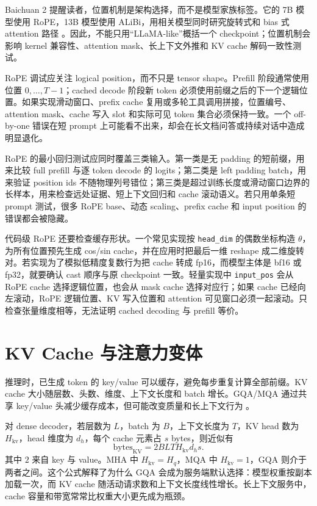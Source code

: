 \documentclass[UTF8,zihao=-4,openany]{ctexbook}
\begin{document}
Baichuan 2 提醒读者，位置机制是架构选择，而不是模型家族标签。它的 7B 模型使用 RoPE，13B 模型使用 ALiBi，用相关模型同时研究旋转式和 bias 式 attention 路径 \cite{yang2023baichuan2}。因此，不能只用“LLaMA-like”概括一个 checkpoint；位置机制会影响 kernel 兼容性、attention mask、长上下文外推和 KV cache 解码一致性测试。

RoPE 调试应关注 logical position，而不只是 tensor shape。Prefill 阶段通常使用位置 $0,\ldots,T-1$；cached decode 阶段新 token 必须使用前缀之后的下一个逻辑位置。如果实现滑动窗口、prefix cache 复用或多轮工具调用拼接，位置编号、attention mask、cache 写入 slot 和实际可见 token 集合必须保持一致。一个 off-by-one 错误在短 prompt 上可能看不出来，却会在长文档问答或持续对话中造成明显退化。

RoPE 的最小回归测试应同时覆盖三类输入。第一类是无 padding 的短前缀，用来比较 full prefill 与逐 token decode 的 logits；第二类是 left padding batch，用来验证 position ids 不随物理列号错位；第三类是超过训练长度或滑动窗口边界的长样本，用来检查远处证据、短上下文回归和 cache 滚动语义。若只用单条短 prompt 测试，很多 RoPE base、动态 scaling、prefix cache 和 input position 的错误都会被隐藏。

代码级 RoPE 还要检查缓存形状。一个常见实现按 \texttt{head\_dim} 的偶数坐标构造 $\theta$，为所有位置预先生成 cos/sin cache，并在应用时把最后一维 reshape 成二维旋转对。若实现为了模拟低精度复数行为把 cache 转成 fp16，而模型主体是 bf16 或 fp32，就要确认 cast 顺序与原 checkpoint 一致。轻量实现中 \texttt{input\_pos} 会从 RoPE cache 选择逻辑位置，也会从 mask cache 选择对应行；如果 cache 已经向左滚动，RoPE 逻辑位置、KV 写入位置和 attention 可见窗口必须一起滚动。只检查张量维度相等，无法证明 cached decoding 与 prefill 等价。

\section{KV Cache 与注意力变体}
推理时，已生成 token 的 key/value 可以缓存，避免每步重复计算全部前缀。KV cache 大小随层数、头数、维度、上下文长度和 batch 增长。GQA/MQA 通过共享 key/value 头减少缓存成本，但可能改变质量和长上下文行为 \cite{ainslie2023gqa}。

对 dense decoder，若层数为 $L$，batch 为 $B$，上下文长度为 $T$，KV head 数为 $H_{\mathrm{kv}}$，head 维度为 $d_h$，每个 cache 元素占 $s$ bytes，则近似有
\[
  \mathrm{bytes}_{\mathrm{KV}}
  = 2BLT H_{\mathrm{kv}}d_hs .
\]
其中 $2$ 来自 key 与 value。MHA 中 $H_{\mathrm{kv}}=H_q$，MQA 中 $H_{\mathrm{kv}}=1$，GQA 则介于两者之间。这个公式解释了为什么 GQA 会成为服务端默认选择：模型权重按副本加载一次，而 KV cache 随活动请求数和上下文长度线性增长。长上下文服务中，cache 容量和带宽常常比权重大小更先成为瓶颈。
\end{document}
